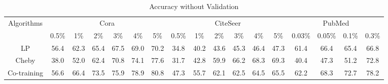 \begin{table*}[htbp]
\setlength{\tabcolsep}{1pt}
  \centering
  \caption{Accuracy without Validation}
  \scriptsize
    \begin{tabular}{c|cccccc|cccccc|cccc}
    \multirow{2}[1]{*}{Algorithms} & \multicolumn{6}{c|}{Cora}                     & \multicolumn{6}{c|}{CiteSeer}                 & \multicolumn{4}{c}{PubMed} \\
          & 0.5\% & 1\%   & 2\%   & 3\%   & 4\%   & 5\%   & 0.5\% & 1\%   & 2\%   & 3\%   & 4\%   & 5\%   & 0.03\% & 0.05\% & 0.1\% & 0.3\% \\
    \midrule
    LP    & \cellcolor[rgb]{ .996,  .918,  .514}56.4 & \cellcolor[rgb]{ .992,  .796,  .494}62.3 & \cellcolor[rgb]{ .976,  .545,  .443}65.4 & \cellcolor[rgb]{ .973,  .412,  .42}67.5 & \cellcolor[rgb]{ .973,  .412,  .42}69.0 & \cellcolor[rgb]{ .973,  .412,  .42}70.2 & \cellcolor[rgb]{ .976,  .514,  .439}34.8 & \cellcolor[rgb]{ .973,  .412,  .42}40.2 & \cellcolor[rgb]{ .973,  .412,  .42}43.6 & \cellcolor[rgb]{ .973,  .412,  .42}45.3 & \cellcolor[rgb]{ .973,  .412,  .42}46.4 & \cellcolor[rgb]{ .973,  .412,  .42}47.3 & \cellcolor[rgb]{ .812,  .867,  .51}61.4 & \cellcolor[rgb]{ .82,  .871,  .51}66.4 & \cellcolor[rgb]{ .992,  .796,  .49}65.4 & \cellcolor[rgb]{ .973,  .412,  .42}66.8 \\
    Cheby & \cellcolor[rgb]{ .973,  .412,  .42}38.0 & \cellcolor[rgb]{ .973,  .412,  .42}52.0 & \cellcolor[rgb]{ .973,  .412,  .42}62.4 & \cellcolor[rgb]{ .98,  .596,  .455}70.8 & \cellcolor[rgb]{ .984,  .678,  .471}74.1 & \cellcolor[rgb]{ .992,  .792,  .49}77.6 & \cellcolor[rgb]{ .973,  .412,  .42}31.7 & \cellcolor[rgb]{ .976,  .482,  .431}42.8 & \cellcolor[rgb]{ .988,  .773,  .486}59.9 & \cellcolor[rgb]{ .996,  .863,  .506}66.2 & \cellcolor[rgb]{ .996,  .882,  .51}68.3 & \cellcolor[rgb]{ .996,  .886,  .51}69.3 & \cellcolor[rgb]{ .973,  .412,  .42}40.4 & \cellcolor[rgb]{ .973,  .412,  .42}47.3 & \cellcolor[rgb]{ .973,  .412,  .42}51.2 & \cellcolor[rgb]{ .984,  .698,  .475}72.8 \\
    Co-training & \cellcolor[rgb]{ 1,  .922,  .518}56.6 & \cellcolor[rgb]{ .949,  .91,  .518}66.4 & \cellcolor[rgb]{ .996,  .914,  .514}73.5 & \cellcolor[rgb]{ .996,  .882,  .51}75.9 & \cellcolor[rgb]{ .961,  .914,  .518}78.9 & \cellcolor[rgb]{ .843,  .878,  .51}80.8 & \cellcolor[rgb]{ .996,  .922,  .518}47.3 & \cellcolor[rgb]{ .992,  .847,  .502}55.7 & \cellcolor[rgb]{ .992,  .82,  .498}62.1 & \cellcolor[rgb]{ .992,  .78,  .49}62.5 & \cellcolor[rgb]{ .992,  .8,  .494}64.5 & \cellcolor[rgb]{ .992,  .804,  .494}65.5 & \cellcolor[rgb]{ .765,  .855,  .506}62.2 & \cellcolor[rgb]{ .671,  .827,  .502}68.3 & \cellcolor[rgb]{ .725,  .843,  .502}72.7 & \cellcolor[rgb]{ .831,  .875,  .51}78.2 \\

\end{tabular}
\end{table*}
